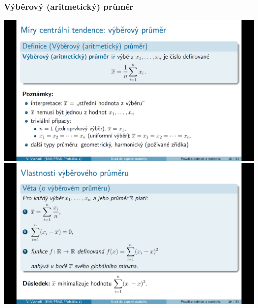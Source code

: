 \subsubsection{Výběrový (aritmetický) průměr}
\begin{center}
	\includegraphics[scale=0.32]{img/prumer_definition.png}
	\includegraphics[scale=0.32]{img/prumer_properties.png}
\end{center}

